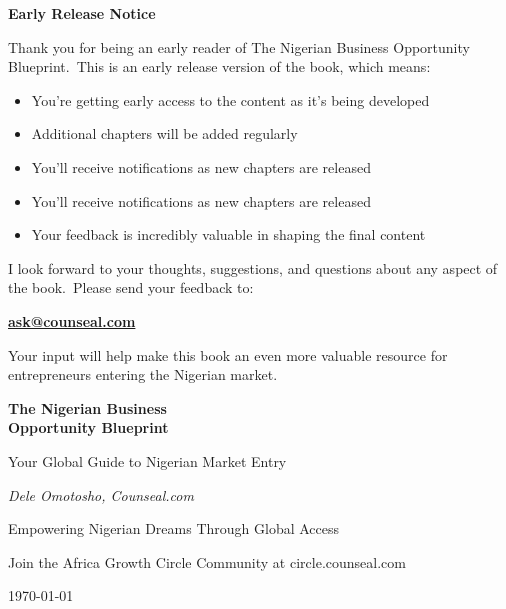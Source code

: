 \documentclass[11pt,letterpaper,openany]{book}
\newcommand{\currentdate}{\today}
\begin{document}
    \frontmatter
    \newpage
    \thispagestyle{empty}
    \begin{center}
        \Large\bfseries\color{primarydark}
        Early Release Notice
    \end{center}
    \vspace{1cm}

    \begin{tcolorbox}[colback=primarylight,colframe=primarydark]
        Thank you for being an early reader of The Nigerian Business Opportunity Blueprint.\ This is an early release version of the book, which means:

        \begin{itemize}
            \item You're getting early access to the content as it's being developed
            \item Additional chapters will be added regularly
            \item You'll receive notifications as new chapters are released
            \item You'll receive notifications as new chapters are released
            \item Your feedback is incredibly valuable in shaping the final content
        \end{itemize}

        I look forward to your thoughts, suggestions, and questions about any aspect of the book.\ Please send your feedback to:

        \begin{center}
            \large\textbf{\href{mailto:ask@counseal.com}{ask@counseal.com}}
        \end{center}

        Your input will help make this book an even more valuable resource for entrepreneurs entering the Nigerian market.
    \end{tcolorbox}
    
    \begin{titlepage}
        \centering
        \vspace*{2cm}
        {\Huge\bfseries\color{primarydark} The Nigerian Business\\Opportunity Blueprint\par}
        \vspace{1cm}
        {\Large\color{primary} Your Global Guide to Nigerian Market Entry\par}
        \vspace{2cm}
        {\Large\itshape Dele Omotosho, Counseal.com\par}
        \vspace{1cm}
        {\large Empowering Nigerian Dreams Through Global Access\par}
        \vfill
        {\large Join the Africa Growth Circle Community at circle.counseal.com\par}
        \vspace{1cm}
        {\large \currentdate\par}
    \end{titlepage}
\end{document}

